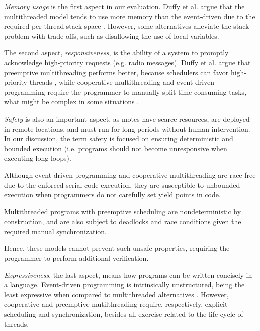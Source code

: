 \documentclass{sig-alternate-ipsn09}
\newcommand{\2}{\;\;}
\newcommand{\5}{\;\;\;\;\;}
\begin{document}

\emph{Memory usage} is the first aspect in our evaluation.
Duffy et al. argue that the multithreaded model tends to use more memory than 
the event-driven due to the required per-thread stack space 
\cite{wsn.comparison}.
However, some alternatives \cite{wsn.protothreads,wsn.ythreads} alleviate the 
stack problem with trade-offs, such as disallowing the use of local variables.

The second aspect, \emph{responsiveness}, is the ability of a system to 
promptly acknowledge high-priority requests (e.g. radio messages).
Duffy et al. argue that preemptive multithreading performs better, because 
schedulers can favor high-priority threads \cite{wsn.comparison}, while 
cooperative multithreading and event-driven programming require the programmer 
to manually split time consuming tasks, what might be complex in some 
situations \cite{wsn.comparison}.

\emph{Safety} is also an important aspect, as motes have scarce resources, are 
deployed in remote locations, and must run for long periods without human 
intervention.
In our discussion, the term safety is focused on ensuring deterministic and 
bounded execution (i.e.  programs should not become unresponsive when executing 
long loops).

Although event-driven programming and cooperative multithreading are race-free 
due to the enforced serial code execution, they are susceptible to unbounded 
execution when programmers do not carefully set yield points in code.

Multithreaded programs with preemptive scheduling are nondeterministic by 
construction, and are also subject to deadlocks and race conditions given the
required manual synchronization.

Hence, these models cannot prevent such unsafe properties, requiring the 
programmer to perform additional verification.

\emph{Expressiveness}, the last aspect, means how programs can be written 
concisely in a language.
Event-driven programming is intrinsically unstructured, being the least 
expressive when compared to multithreaded alternatives 
\cite{sync_async.cooperative}.
However, cooperative and preemptive mutilthreading require, respectively, 
explicit scheduling and synchronization, besides all exercise related to the 
life cycle of threads.
\end{document}
